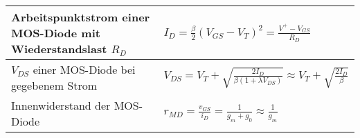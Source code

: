 \begin{tabular}{|l|l|}
	\hline
	Arbeitspunktstrom einer MOS-Diode mit Wiederstandslast $R_D$
	& $I_D = \frac{\beta}{2} (V_{GS} -V_T)^2 = \frac{V^+ - V_{GS}}{R_D} $
	\\ \hline
	$V_{DS}$ einer MOS-Diode bei gegebenem Strom
	& $ V_{DS} = V_T + \sqrt{\frac{2I_D}{\beta(1+\lambda V_{DS})}} \approx V_T + \sqrt{\frac{2I_D}{\beta}} $
	\\ \hline
	Innenwiderstand der MOS-Diode
	& $ r_{MD} = \frac{v_{GS}}{i_D} = \frac{1}{g_m + g_0} \approx \frac{1}{g_m} $
	\\ \hline	
\end{tabular}

